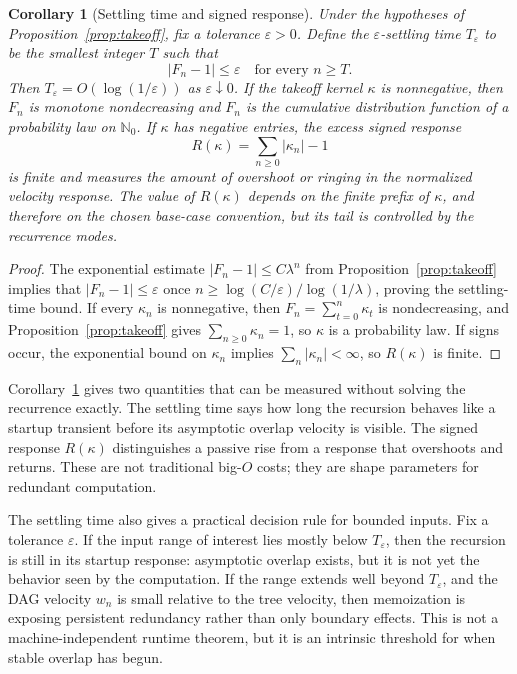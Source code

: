 \documentclass[10pt,twocolumn]{article}
\newtheorem{corollary}{Corollary}
\begin{document}
\begin{corollary}[Settling time and signed response]\label{cor:settling}
Under the hypotheses of Proposition~\ref{prop:takeoff}, fix a tolerance \(\varepsilon>0\).  Define the \(\varepsilon\)-settling time \(T_\varepsilon\) to be the smallest integer \(T\) such that
\[
        |F_n-1|\le\varepsilon
        \quad\text{for every } n\ge T.
\]
Then \(T_\varepsilon=O(\log(1/\varepsilon))\) as \(\varepsilon\downarrow0\).  If the takeoff kernel \(\kappa\) is nonnegative, then \(F_n\) is monotone nondecreasing and \(F_n\) is the cumulative distribution function of a probability law on \(\mathbb{N}_0\).  If \(\kappa\) has negative entries, the excess signed response
\[
        R(\kappa)=\sum_{n\ge0}|\kappa_n|-1
\]
is finite and measures the amount of overshoot or ringing in the normalized velocity response.  The value of \(R(\kappa)\) depends on the finite prefix of \(\kappa\), and therefore on the chosen base-case convention, but its tail is controlled by the recurrence modes.
\end{corollary}

\begin{proof}
The exponential estimate \(|F_n-1|\le C\lambda^n\) from Proposition~\ref{prop:takeoff} implies that \(|F_n-1|\le\varepsilon\) once \(n\ge \log(C/\varepsilon)/\log(1/\lambda)\), proving the settling-time bound.  If every \(\kappa_n\) is nonnegative, then \(F_n=\sum_{t=0}^n\kappa_t\) is nondecreasing, and Proposition~\ref{prop:takeoff} gives \(\sum_{n\ge0}\kappa_n=1\), so \(\kappa\) is a probability law.  If signs occur, the exponential bound on \(\kappa_n\) implies \(\sum_n|\kappa_n|<\infty\), so \(R(\kappa)\) is finite.
\end{proof}

Corollary~\ref{cor:settling} gives two quantities that can be measured without solving the recurrence exactly.  The settling time says how long the recursion behaves like a startup transient before its asymptotic overlap velocity is visible.  The signed response \(R(\kappa)\) distinguishes a passive rise from a response that overshoots and returns.  These are not traditional big-\(O\) costs; they are shape parameters for redundant computation.

The settling time also gives a practical decision rule for bounded inputs.  Fix a tolerance \(\varepsilon\).  If the input range of interest lies mostly below \(T_\varepsilon\), then the recursion is still in its startup response: asymptotic overlap exists, but it is not yet the behavior seen by the computation.  If the range extends well beyond \(T_\varepsilon\), and the DAG velocity \(w_n\) is small relative to the tree velocity, then memoization is exposing persistent redundancy rather than only boundary effects.  This is not a machine-independent runtime theorem, but it is an intrinsic threshold for when stable overlap has begun.
\end{document}
